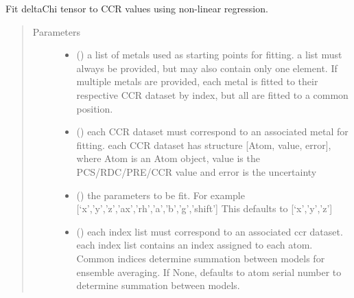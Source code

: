 \documentclass[a4paper,10pt,english]{sphinxmanual}
\begin{document}
\begin{fulllineitems}
\label{\detokenize{reference/generated/paramagpy.fit.nlr_fit_metal_from_ccr:paramagpy.fit.nlr_fit_metal_from_ccr}}
Fit deltaChi tensor to CCR values using non-linear regression.
\begin{quote}\begin{description}
\item[{Parameters}] \leavevmode\begin{itemize}
\item {} 
 () \textendash{} a list of metals used as starting points for fitting.
a list must always be provided, but may also contain
only one element. If multiple metals are provided, each metal
is fitted to their respective CCR dataset by index, but all are
fitted to a common position.

\item {} 
 () \textendash{} each CCR dataset must correspond to an associated metal for fitting.
each CCR dataset has structure {[}Atom, value, error{]}, where Atom is
an Atom object, value is the PCS/RDC/PRE/CCR value
and error is the uncertainty

\item {} 
 () \textendash{} the parameters to be fit.
For example {[}‘x’,’y’,’z’,’ax’,’rh’,’a’,’b’,’g’,’shift’{]}
This defaults to {[}‘x’,’y’,’z’{]}

\item {} 
 (\sphinxstyleliteralemphasis{\sphinxupquote{, }}) \textendash{} each index list must correspond to an associated ccr dataset.
each index list contains an index assigned to each atom.
Common indices determine summation between models
for ensemble averaging.
If None, defaults to atom serial number to determine summation
between models.


\end{itemize}
\end{description}
\end{quote}
\end{fulllineitems}
\end{document}
